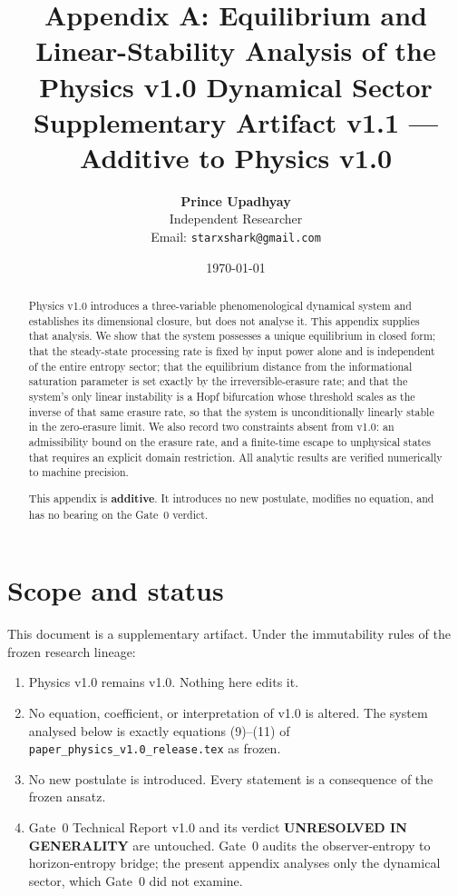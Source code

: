 \documentclass[11pt,a4paper]{article}
\title{\textbf{Appendix A: Equilibrium and Linear-Stability Analysis of the
Physics v1.0 Dynamical Sector}\\[0.4em]
\large Supplementary Artifact v1.1 --- Additive to Physics v1.0}
\author{
    \textbf{Prince Upadhyay}\\
    \small Independent Researcher\\
    \small Email: \texttt{starxshark@gmail.com}
}
\date{\today}
\theoremstyle{definition}
\begin{document}
\maketitle

\begin{abstract}
Physics v1.0 introduces a three-variable phenomenological dynamical system and
establishes its dimensional closure, but does not analyse it. This appendix
supplies that analysis. We show that the system possesses a unique equilibrium
in closed form; that the steady-state processing rate is fixed by input power
alone and is independent of the entire entropy sector; that the equilibrium
distance from the informational saturation parameter is set exactly by the
irreversible-erasure rate; and that the system's only linear instability is a
Hopf bifurcation whose threshold scales as the inverse of that same erasure
rate, so that the system is unconditionally linearly stable in the
zero-erasure limit. We also record two constraints absent from v1.0: an
admissibility bound on the erasure rate, and a finite-time escape to
unphysical states that requires an explicit domain restriction. All analytic
results are verified numerically to machine precision.

This appendix is \textbf{additive}. It introduces no new postulate, modifies no
equation, and has no bearing on the Gate~0 verdict.
\end{abstract}

\tableofcontents
\newpage

\section{Scope and status}

This document is a supplementary artifact. Under the immutability rules of the
frozen research lineage:

\begin{enumerate}
\item Physics v1.0 remains v1.0. Nothing here edits it.
\item No equation, coefficient, or interpretation of v1.0 is altered. The
system analysed below is exactly equations (9)--(11) of
\texttt{paper\_physics\_v1.0\_release.tex} as frozen.
\item No new postulate is introduced. Every statement is a consequence of the
frozen ansatz.
\item Gate~0 Technical Report v1.0 and its verdict \textbf{UNRESOLVED IN
GENERALITY} are untouched. Gate~0 audits the observer-entropy to
horizon-entropy bridge; the present appendix analyses only the dynamical
sector, which Gate~0 did not examine.
\end{enumerate}
\end{document}

